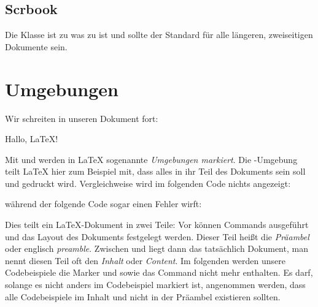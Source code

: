\subsection{Scrbook}
Die Klasse  ist zu  was  zu  ist und sollte der Standard für alle längeren, zweiseitigen Dokumente sein.


\section{Umgebungen}
Wir schreiten in unseren Dokument fort:
\begin{latexlisting}
	
		Hallo, LaTeX!
	
\end{latexlisting}
Mit  und  werden in \LaTeX{} sogenannte \emph{Umgebungen markiert}.
Die -Umgebung teilt \LaTeX{} hier zum Beispiel mit, dass alles in ihr Teil des Dokuments sein soll und gedruckt wird.
Vergleichweise wird im folgenden Code nichts angezeigt:
während der folgende Code sogar einen Fehler wirft:
Dies teilt ein \LaTeX{}-Dokument in zwei Teile:
Vor  können Commands ausgeführt und das Layout des Dokuments festgelegt werden.
Dieser Teil heißt die \emph{Präambel} oder englisch \emph{preamble}.
Zwischen  und  liegt dann das tatsächlich Dokument, man nennt diesen Teil oft den \emph{Inhalt} oder \emph{Content}.
Im folgenden werden unsere Codebeispiele die Marker  und  sowie das Command  nicht mehr enthalten.
Es darf, solange es nicht anders im Codebeispiel markiert ist, angenommen werden, dass alle Codebeispiele im Inhalt und nicht in der Präambel existieren sollten. 

